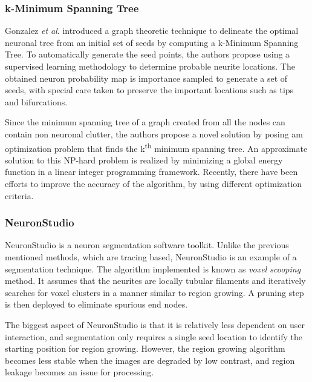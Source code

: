 \subsubsection{k-Minimum Spanning Tree}
Gonzalez \textit{et al}. \cite{turetken_Diadem} introduced a graph theoretic technique to delineate the optimal neuronal tree from an initial set of seeds by computing a k-Minimum Spanning Tree. To automatically generate the seed points, the authors propose using a supervised learning methodology to determine probable neurite locations. The obtained neuron probability map is importance sampled to generate a set of seeds, with special care taken to preserve the important locations such as tips and bifurcations. 

Since the minimum spanning tree of a graph created from all the nodes can contain non neuronal clutter, the authors propose a novel solution by posing am optimization problem that finds the k\textsuperscript{th} minimum spanning tree. An approximate solution to this NP-hard problem is realized by minimizing a global energy function in a linear integer programming framework. Recently, there have been efforts to improve the accuracy of the algorithm, by using different optimization criteria\cite{turetken_MIP}. 

\subsubsection{NeuronStudio}
NeuronStudio\cite{wearne_neuronStudio} is a neuron segmentation software toolkit. Unlike the previous mentioned methods, which are tracing based, NeuronStudio is an example of a segmentation technique. The algorithm implemented is known as \textit{voxel scooping} method\cite{rodriguez_voxelscoop}. It assumes that the neurites are locally tubular filaments and iteratively searches for voxel clusters in a manner similar to region growing. A pruning step is then deployed to eliminate spurious end nodes.

The biggest aspect of NeuronStudio is that it is relatively less dependent on user interaction, and segmentation only requires a single seed location to identify the starting position for region growing. However, the region growing algorithm becomes less stable when the images are degraded by low contrast, and region leakage becomes an issue for processing.

